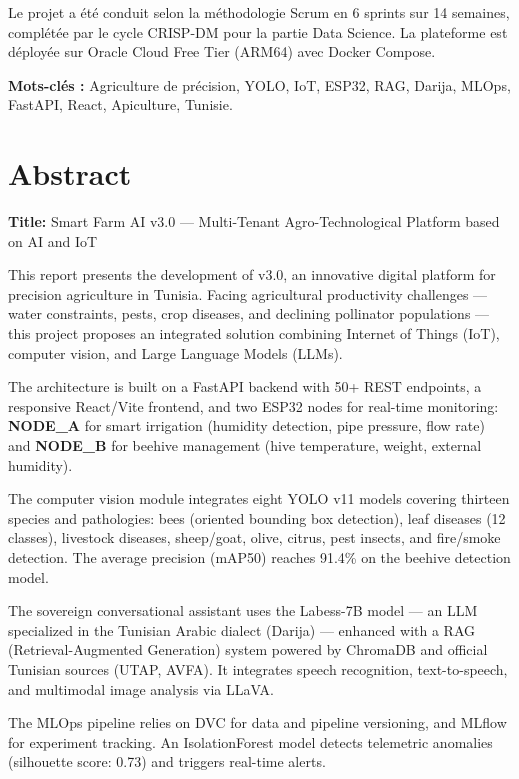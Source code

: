 Le projet a été conduit selon la méthodologie Scrum en 6 sprints sur 14 semaines, complétée par le cycle CRISP-DM pour la partie Data Science. La plateforme est déployée sur Oracle Cloud Free Tier (ARM64) avec Docker Compose.

\medskip
\noindent\textbf{Mots-clés :} Agriculture de précision, YOLO, IoT, ESP32, RAG, Darija, MLOps, FastAPI, React, Apiculture, Tunisie.

\cleardoublepage

\chapter*{Abstract}
\thispagestyle{empty}

\noindent\textbf{Title:} Smart Farm AI v3.0 — Multi-Tenant Agro-Technological Platform based on AI and IoT

\medskip
This report presents the development of \farmAI{} v3.0, an innovative digital platform for precision agriculture in Tunisia. Facing agricultural productivity challenges — water constraints, pests, crop diseases, and declining pollinator populations — this project proposes an integrated solution combining Internet of Things (IoT), computer vision, and Large Language Models (LLMs).

The architecture is built on a FastAPI backend with 50+ REST endpoints, a responsive React/Vite frontend, and two ESP32 nodes for real-time monitoring: \textbf{NODE\_A} for smart irrigation (humidity detection, pipe pressure, flow rate) and \textbf{NODE\_B} for beehive management (hive temperature, weight, external humidity).

The computer vision module integrates eight YOLO v11 models covering thirteen species and pathologies: bees (oriented bounding box detection), leaf diseases (12 classes), livestock diseases, sheep/goat, olive, citrus, pest insects, and fire/smoke detection. The average precision (mAP50) reaches 91.4\% on the beehive detection model.

The sovereign conversational assistant uses the Labess-7B model — an LLM specialized in the Tunisian Arabic dialect (Darija) — enhanced with a RAG (Retrieval-Augmented Generation) system powered by ChromaDB and official Tunisian sources (UTAP, AVFA). It integrates speech recognition, text-to-speech, and multimodal image analysis via LLaVA.

The MLOps pipeline relies on DVC for data and pipeline versioning, and MLflow for experiment tracking. An IsolationForest model detects telemetric anomalies (silhouette score: 0.73) and triggers real-time alerts.

